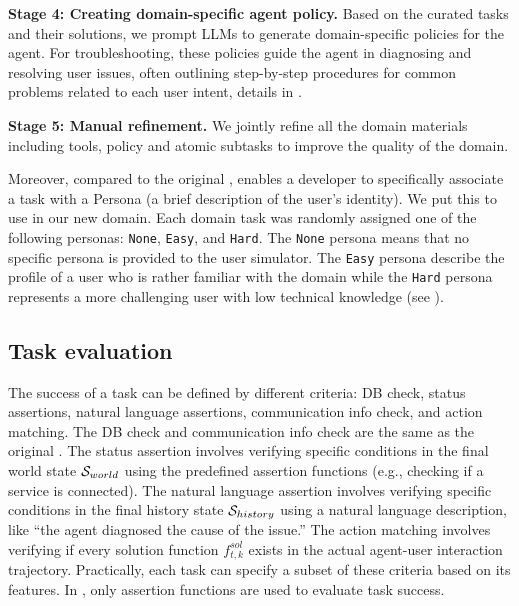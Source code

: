\textbf{Stage 4: Creating domain-specific agent policy.}
Based on the curated tasks and their solutions, we prompt LLMs to generate domain-specific policies for the agent. For troubleshooting, these policies guide the agent in diagnosing and resolving user issues, often outlining step-by-step procedures for common problems related to each user intent, details in .

\textbf{Stage 5: Manual refinement.} We jointly refine all the domain materials including tools, policy and atomic subtasks to improve the quality of the domain.

Moreover, compared to the original \taubench, \bench enables a developer to specifically associate a task with a Persona (a brief description of the user's identity).
We put this to use in our new domain. Each \telecom domain task was randomly assigned one of the following personas: \texttt{None}, \texttt{Easy}, and \texttt{Hard}. The \texttt{None} persona means that no specific persona is provided to the user simulator. The \texttt{Easy} persona describe the profile of a user who is rather familiar with the domain while the \texttt{Hard} persona represents a more challenging user with low technical knowledge (see ).

\subsection{Task evaluation}
The success of a task can be defined by different criteria: DB check, status assertions, natural language assertions, communication info check, and action matching.
The DB check and communication info check are the same as the original \taubench. The status assertion involves verifying specific conditions in the final world state ${\mathcal{S}}_{world}$ using the predefined assertion functions (e.g., checking if a service is connected). The natural language assertion involves verifying specific conditions in the final history state ${\mathcal{S}}_{history}$ using a natural language description, like ``the agent diagnosed the cause of the issue.'' The action matching involves verifying if every solution function $f_{t,k}^{sol}$ exists in the actual agent-user interaction trajectory.
Practically, each task can specify a subset of these criteria based on its features. In \telecom, only assertion functions are used to evaluate task success.


